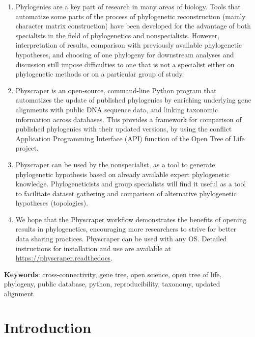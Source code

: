 \documentclass[]{article}
\begin{document}
\begin{enumerate}
\def\labelenumi{\arabic{enumi}.}
\item
  Phylogenies are a key part of research in many areas of biology. Tools that automatize
  some parts of the process of phylogenetic reconstruction (mainly character matrix construction)
  have been developed for the advantage of both specialists in the field of phylogenetics and nonspecialists.
  However, interpretation of results, comparison with previously available phylogenetic
  hypotheses, and choosing of one phylogeny for downstream analyses and discussion still impose difficulties
  to one that is not a specialist either on phylogenetic methods or on a particular group of study.
\item
  Physcraper is an open‐source, command-line Python program that automatizes the update of published
  phylogenies by enriching underlying gene alignments with public DNA sequence data, and linking taxonomic information across databases.
  This provides a framework for comparison of published phylogenies with their updated versions, by using the conflict Application Programming Interface (API) function of the Open Tree of Life project.
\item
  Physcraper can be used by the nonspecialist, as a tool to generate phylogenetic
  hypothesis based on already available expert phylogenetic knowledge.
  Phylogeneticists and group specialists will find it useful as a tool to facilitate dataset gathering and comparison
  of alternative phylogenetic hypotheses (topologies).
\item
  We hope that the Physcraper workflow demonstrates the benefits of opening results in phylogenetics, encouraging more researchers to strive for better data sharing practices. Physcraper can be used with any OS. Detailed instructions for installation and
  use are available at \href{https://physcraper.readthedocs.io/en/tutorial/index.html}{https://physcraper.readthedocs}.
\end{enumerate}

\textbf{Keywords}: cross-connectivity, gene tree, open science, open tree of life, phylogeny, public database, python, reproducibility, taxonomy, updated alignment

\newpage

\hypertarget{introduction}{%
\section{Introduction}\label{introduction}}
\end{document}
